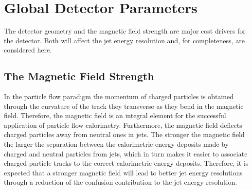 \section{Global Detector Parameters}
The detector geometry and the magnetic field strength are major cost drivers for the detector.  Both will affect the jet energy resolution and, for completeness, are considered here.  


\subsection{The Magnetic Field Strength}
\label{sec:bfield}
In the particle flow paradigm the momentum of charged particles is obtained through the curvature of the track they transverse as they bend in the magnetic field.  Therefore, the magnetic field is an integral element for the successful application of particle flow calorimetry.  Furthermore, the magnetic field deflects charged particles away from neutral ones in jets.  The stronger the magnetic field the larger the separation between the calorimetric energy deposits made by charged and neutral particles from jets, which in turn makes it easier to associate charged particle tracks to the correct calorimetric energy deposits.  Therefore, it is expected that a stronger magnetic field will lead to better jet energy resolutions through a reduction of the confusion contribution to the jet energy resolution.  

